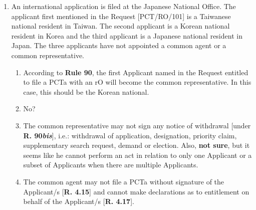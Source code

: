 \documentclass{report}
\begin{document}
\begin{enumerate}[label=\textbf{Answer \arabic*}]
    \item %
    An international application is filed at the Japanese National Office. The applicant first mentioned in the Request [PCT/RO/101] is a Taiwanese national resident in Taiwan. The second applicant is a Korean national resident in Korea and the third applicant is a Japanese national resident in Japan. The three applicants have not appointed a common agent or a common representative.
    \begin{enumerate}[label=(\alph*)]
        \item According to \textbf{Rule 90}, the first Applicant named in the Request entitled to file a PCTa with an rO will become the common representative. In this case, this should be the Korean national.
        \item No?
        \item The common representative may not sign any notice of withdrawal [under \textbf{R. 90\textit{bis}}], i.e.: withdrawal of application, designation, priority claim, supplementary search request, demand or election. Also, \textbf{not sure}, but it seems like he cannot perform an act in relation to only one Applicant or a subset of Applicants when there are multiple Applicants. 
        \item The common agent may not file a PCTa without signature of the Applicant/s [\textbf{R. 4.15}] and cannot make declarations as to entitlement on behalf of the Applicant/s [\textbf{R. 4.17}].
    \end{enumerate}


\end{enumerate}
\end{document}
